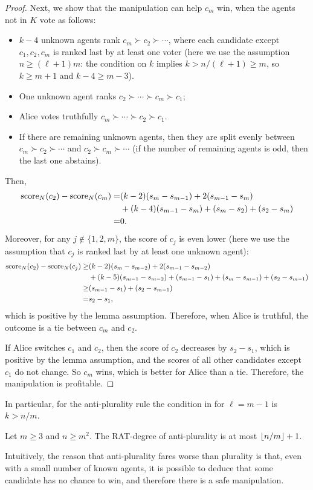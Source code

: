 \begin{proof}
Next, we show that the manipulation can help $c_m$ win, when the agents not in $K$ vote as follows:
\begin{itemize}
\item $k-4$ unknown agents rank $c_m\succ c_2\succ \cdots $,
where each candidate except $c_1,c_2,c_m$ is ranked last by at least one voter (here we use the assumption $n\geq (\ell+1)m$: the condition on $k$ implies $k>n/(\ell+1)\geq m$, so $k\geq m+1$ and $k-4\geq m-3$).
\item One unknown agent ranks 
$c_2\succ \cdots \succ c_m \succ c_1$;
\item Alice votes truthfully $c_m\succ  \cdots \succ c_2 \succ c_1$.  
\item If there are remaining unknown agents, then they are split evenly between 
$c_m\succ c_2\succ \cdots $ and 
$c_2\succ c_m\succ \cdots $ (if the number of remaining agents is odd, then the last one abstains).
\end{itemize}
Then,
\begin{align*}
\operatorname{score}_N(c_2) - \operatorname{score}_N(c_m)
=&
(k-2)(s_{m}-s_{m-1}) 
+ 2(s_{m-1}-s_{m})
\\
&+
(k-4)(s_{m-1}-s_{m}) 
+ (s_m-s_2)
+ (s_2-s_m)
\\
=&
0.
\end{align*}
Moreover, for any $j\not\in\{1,2,m\}$, the score of $c_j$ is even lower (here we use the assumption that $c_j$ is ranked last by at least one unknown agent):
\begin{align*}
\operatorname{score}_N(c_2) - \operatorname{score}_N(c_j)
\geq &
(k-2)(s_{m}-s_{m-2}) 
+ 2(s_{m-1}-s_{m-2})
\\
&+
(k-5)(s_{m-1}-s_{m-2}) 
+ (s_{m-1}-s_1)
+ (s_m-s_{m-1})
+ (s_2-s_{m-1})
\\
\geq & (s_{m-1}-s_{1})
+ (s_2-s_{m-1})
\\
= & s_2 - s_1,
\end{align*}
which is positive by the lemma assumption.
Therefore, when Alice is truthful, the outcome is a tie between $c_m$ and $c_2$.

If Alice switches $c_1$ and $c_2$, then the score of $c_2$ decreases by $s_2-s_1$, which is positive by the lemma assumption, and the scores of all other candidates except $c_1$ do not change. So $c_m$ wins, which is better for Alice than a tie.
Therefore, the manipulation is profitable.
\end{proof}

In particular, for the anti-plurality rule the condition in  for $\ell=m-1$ is $k>n/m$.
\begin{corollary}
Let $m\geq 3$ and $n\geq m^2$.
The RAT-degree of anti-plurality is at most $\left\lfloor n/m \right\rfloor+1$.
\end{corollary}
Intuitively, the reason that anti-plurality fares worse than plurality is that, even with a small number of known agents, it is possible to deduce that some candidate has no chance to win, and therefore there is a safe manipulation.

